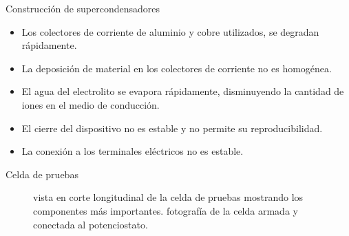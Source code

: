 \documentclass[aspectratio=169]{beamer}
\begin{document}
	\begin{frame}{Construcción de supercondensadores}
		\begin{itemize}
			\item<1,6> Los colectores de corriente de aluminio y cobre utilizados, se degradan rápidamente.
			\item<2,6> La deposición de material en los colectores de corriente no es homogénea.
			\item<3,6> El agua del electrolito se evapora rápidamente, disminuyendo la cantidad de iones en el medio de conducción. 
			\item<4,6> El cierre del dispositivo no es estable y no permite su reproducibilidad.
			\item<5,6> La conexión a los terminales eléctricos no es estable.
		\end{itemize}
	\end{frame}

	\begin{frame}{Celda de pruebas}
		\begin{figure}[h!]
			\centering
			\caption[Celda de pruebas de supercondensador]{ vista en corte longitudinal de la celda de pruebas mostrando los componentes más importantes.  fotografía de la celda armada y conectada al potenciostato.}
			\label{fig:celda_de_pruebas_SC}
		\end{figure}
	\end{frame}
	
\end{document}
